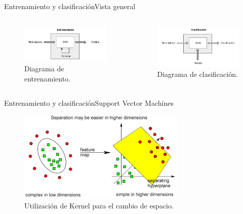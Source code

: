 \documentclass{beamer}
\begin{document}
		\begin{frame}{Entrenamiento y clasificación}{Vista general}
			  \begin{columns}[onlytextwidth]
   	 			\begin{column}{0.5\textwidth}
		            \begin{figure}[bt]
    			    			\centering
            		    		\includegraphics[width=6cm]{imagenes/Entrenamiento.png}
          				\caption{Diagrama de entrenamiento.}
            			\end{figure}
 				\end{column}
    				\begin{column}{0.5\textwidth}
		            \begin{figure}[bt]
        					\centering
        		        		\includegraphics[width=6cm]{imagenes/Clasificacion.png}
        	  				\caption{Diagrama de clasificación.}
		            \end{figure}
        			\end{column}
 			  \end{columns}
        \end{frame}


		\begin{frame}{Entrenamiento y clasificación}{Support Vector Machines}
            \begin{figure}[bt]
        		\centering
                \includegraphics[width=8cm]{imagenes/svm.jpg}
          		\caption{Utilización de Kernel para el cambio de espacio.}
            \end{figure}
        \end{frame}
        
\end{document}
